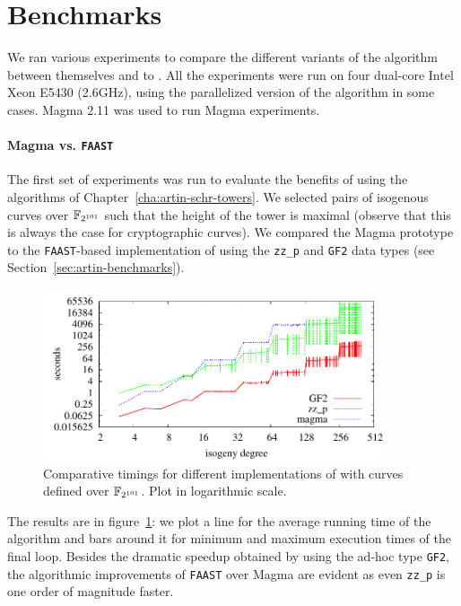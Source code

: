 \section{Benchmarks}
\label{sec:benchmarks}
We ran various experiments to compare the different variants of the
algorithm \ctwo{} between themselves and to
. All the experiments were
run on four dual-core Intel Xeon E5430 (2.6GHz), using the
parallelized version of the algorithm in some cases. Magma 2.11 was
used to run Magma experiments.

\paragraph{Magma vs. \texttt{FAAST}}
\label{sec:magma-vs.-textttf}
The first set of experiments was run to evaluate the benefits of using
the algorithms of Chapter~\ref{cha:artin-schr-towers}. We selected
pairs of isogenous curves over $\mathbb{F}_{2^{101}}$ such that the height of
the tower is maximal (observe that this is always the case for
cryptographic curves).  We compared the Magma prototype to the
\texttt{FAAST}-based implementation of \ctwoasfimc{} using the
\texttt{zz\_p} and \texttt{GF2} data types (see
Section~\ref{sec:artin-benchmarks}).

\begin{figure}
  \centering
  \includegraphics[width=0.9\textwidth]{isogeny/p2}
  \caption{Comparative timings for different implementations of \ctwoasfimc{} with curves defined over $\mathbb{F}_{2^{101}}$. Plot in logarithmic scale.}
  \label{fig:2-101}
\end{figure}

The results are in figure~\ref{fig:2-101}: we plot a line for the
average running time of the algorithm and bars around it for minimum
and maximum execution times of the final loop. Besides the dramatic
speedup obtained by using the ad-hoc type \texttt{GF2}, the
algorithmic improvements of \texttt{FAAST} over Magma are evident as
even \texttt{zz\_p} is one order of magnitude faster.

